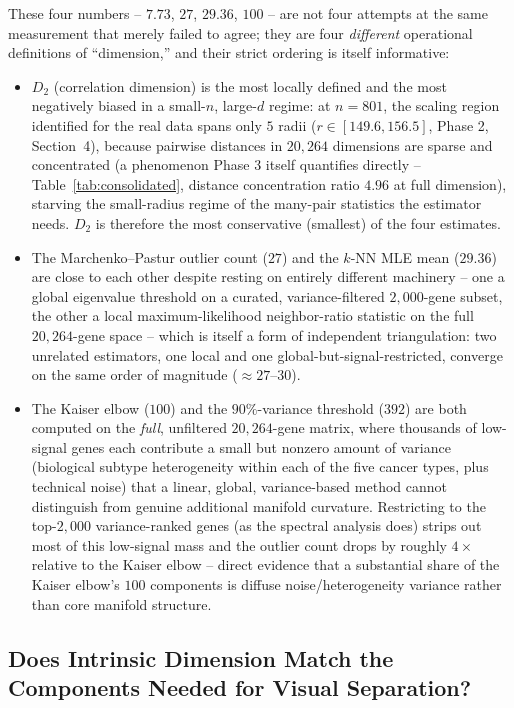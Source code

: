 \documentclass[11pt]{article}
\begin{document}
These four numbers -- $7.73$, $27$, $29.36$, $100$ -- are not four attempts
at the same measurement that merely failed to agree; they are four
\emph{different} operational definitions of ``dimension,'' and their strict
ordering is itself informative:
\begin{itemize}
  \item $D_2$ (correlation dimension) is the most locally defined and the
  most negatively biased in a small-$n$, large-$d$ regime: at $n=801$, the
  scaling region identified for the real data spans only $5$ radii
  ($r \in [149.6, 156.5]$, Phase 2, Section~4), because pairwise distances
  in $20{,}264$ dimensions are sparse and concentrated (a phenomenon Phase 3
  itself quantifies directly -- Table~\ref{tab:consolidated}, distance
  concentration ratio $4.96$ at full dimension), starving the small-radius
  regime of the many-pair statistics the estimator needs. $D_2$ is
  therefore the most conservative (smallest) of the four estimates.
  \item The Marchenko--Pastur outlier count ($27$) and the $k$-NN MLE mean
  ($29.36$) are close to each other despite resting on entirely different
  machinery -- one a global eigenvalue threshold on a curated,
  variance-filtered $2{,}000$-gene subset, the other a local
  maximum-likelihood neighbor-ratio statistic on the full $20{,}264$-gene
  space -- which is itself a form of independent triangulation: two
  unrelated estimators, one local and one global-but-signal-restricted,
  converge on the same order of magnitude ($\approx 27$--$30$).
  \item The Kaiser elbow ($100$) and the $90\%$-variance threshold ($392$)
  are both computed on the \emph{full}, unfiltered $20{,}264$-gene matrix,
  where thousands of low-signal genes each contribute a small but nonzero
  amount of variance (biological subtype heterogeneity within each of the
  five cancer types, plus technical noise) that a linear, global,
  variance-based method cannot distinguish from genuine additional
  manifold curvature. Restricting to the top-$2{,}000$ variance-ranked
  genes (as the spectral analysis does) strips out most of this
  low-signal mass and the outlier count drops by roughly $4\times$ relative
  to the Kaiser elbow -- direct evidence that a substantial share of the
  Kaiser elbow's $100$ components is diffuse noise/heterogeneity variance
  rather than core manifold structure.
\end{itemize}

\subsection{Does Intrinsic Dimension Match the Components Needed for Visual Separation?}
\end{document}
